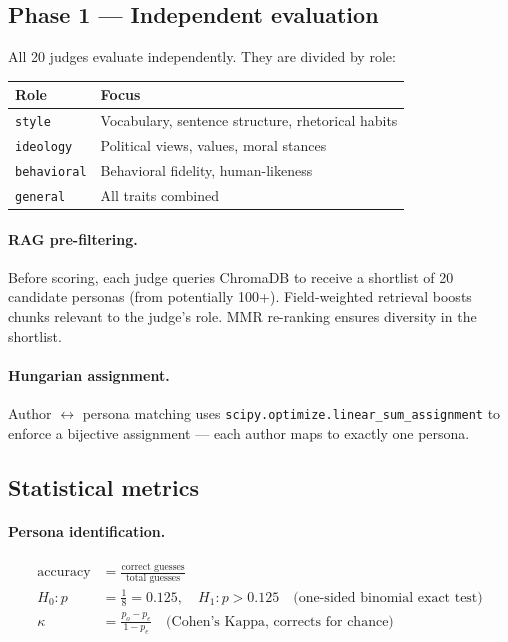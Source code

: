 \documentclass[12pt,a4paper]{article}
\begin{document}
\subsection{Phase 1 --- Independent evaluation}

All 20 judges evaluate independently. They are divided by role:

\begin{tabular}{@{}ll@{}}
\toprule
\textbf{Role} & \textbf{Focus} \\
\midrule
\texttt{style}       & Vocabulary, sentence structure, rhetorical habits \\
\texttt{ideology}    & Political views, values, moral stances \\
\texttt{behavioral}  & Behavioral fidelity, human-likeness \\
\texttt{general}     & All traits combined \\
\bottomrule
\end{tabular}

\paragraph{RAG pre-filtering.}
Before scoring, each judge queries ChromaDB to receive a shortlist of 20 candidate personas
(from potentially 100+). Field-weighted retrieval boosts chunks relevant to the judge's role.
MMR re-ranking ensures diversity in the shortlist.

\paragraph{Hungarian assignment.}
Author $\leftrightarrow$ persona matching uses \texttt{scipy.optimize.linear\_sum\_assignment}
to enforce a bijective assignment --- each author maps to exactly one persona.

\subsection{Statistical metrics}

\paragraph{Persona identification.}
\begin{align}
\text{accuracy} &= \frac{\text{correct guesses}}{\text{total guesses}} \\
H_0: p &= \tfrac{1}{8} = 0.125, \quad H_1: p > 0.125 \quad \text{(one-sided binomial exact test)} \\
\kappa &= \frac{p_o - p_e}{1 - p_e} \quad \text{(Cohen's Kappa, corrects for chance)}
\end{align}
\end{document}
